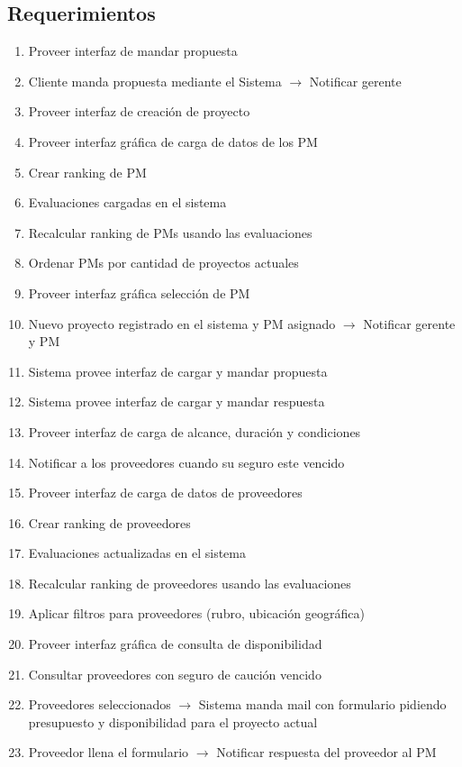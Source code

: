 \subsection{Requerimientos}
\begin{enumerate}

	\item Proveer interfaz de mandar propuesta
	\item Cliente manda propuesta mediante el Sistema $\rightarrow$ Notificar gerente
	\item Proveer interfaz de creación de proyecto
	\item Proveer interfaz gráfica de carga de datos de los PM
	\item Crear ranking de PM
	\item Evaluaciones cargadas en el sistema
	\item Recalcular ranking de PMs usando las evaluaciones
	\item Ordenar PMs por cantidad de proyectos actuales
	\item Proveer interfaz gráfica selección de PM
	\item Nuevo proyecto registrado en el sistema y PM asignado $\rightarrow$ Notificar gerente y PM
	\item Sistema provee interfaz de cargar y mandar propuesta
	\item Sistema provee interfaz de cargar y mandar respuesta
	\item Proveer interfaz de carga de alcance, duración y condiciones
	\item Notificar a los proveedores cuando su seguro este vencido
	\item Proveer interfaz de carga de datos de proveedores
	\item Crear ranking de proveedores
	\item Evaluaciones actualizadas en el sistema
	\item Recalcular ranking de proveedores usando las evaluaciones
	\item Aplicar filtros para proveedores (rubro, ubicación geográfica)	
	\item Proveer interfaz gráfica de consulta de disponibilidad
	\item Consultar proveedores con seguro de caución vencido
	\item Proveedores seleccionados $\rightarrow$ Sistema manda mail con formulario pidiendo presupuesto y disponibilidad para el proyecto actual
	\item Proveedor llena el formulario $\rightarrow$ Notificar respuesta del proveedor al PM	

\end{enumerate}
